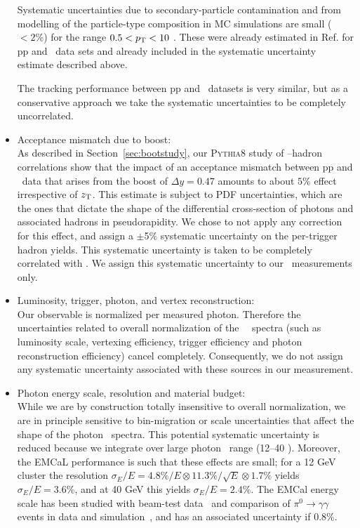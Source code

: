\begin{itemize}
Systematic uncertainties due to secondary-particle contamination and from modelling of the particle-type composition in MC simulations are small ($<2\%$) for the range $0.5<p_{\mathrm{T}}<10$ \GeVc. These were already estimated in Ref.\cite{Acharya:2018qsh} for pp and \pPb~data sets and already included in the systematic uncertainty estimate described above. 

The tracking performance between pp and \pPb~datasets is very similar, but as a conservative approach we take the systematic uncertainties to be completely uncorrelated.



\item Acceptance mismatch due to boost:\\
As described in Section~\ref{sec:bootstudy}, our \textsc{Pythia8} study of \gammaiso--hadron correlations show that the impact of an acceptance mismatch between pp and \pPb~data that arises from the boost of $\Delta y = 0.47$ amounts to about $5\%$ effect irrespective of $z_{\mathrm{T}}$. This estimate is subject to PDF uncertainties, which are the ones that dictate the shape of the differential cross-section of photons and associated hadrons in pseudorapidity. We chose to not apply any correction for this effect, and assign a $\pm$5$\%$ systematic uncertainty on the per-trigger hadron yields. This systematic uncertainty is taken to be completely correlated with \zt. We assign this systematic uncertainty to our \pPb~measurements only. 


\item Luminosity, trigger, photon, and vertex reconstruction:\\
Our observable is normalized per measured photon. Therefore the uncertainties related to overall normalization of the \gammaiso~\pt~spectra (such as luminosity scale, vertexing efficiency, trigger efficiency and photon reconstruction efficiency) cancel completely. Consequently, we do not assign any systematic uncertainty associated with these sources in our measurement. 
\item Photon energy scale, resolution and material budget:\\
While we are by construction totally insensitive to overall normalization, we are in principle sensitive to bin-migration or scale uncertainties that affect the shape of the photon \pt~spectra. This potential systematic uncertainty is reduced because we integrate over large photon \pt~range (12--40 \GeVc). Moreover, the EMCaL performance is such that these effects are small; for a 12 GeV cluster the resolution  $\sigma_{E}/E = 4.8\%/E\otimes 11.3\%/\sqrt{E}\otimes 1.7\%$ yields $\sigma_{E}/E =3.6\%$, and at 40 GeV this yields $\sigma_{E}/E =2.4\%$. The EMCal energy scale has been studied with beam-test data~\cite{Allen:2009aa} and comparison of $\pi^{0}\to\gamma\gamma$ events in data and simulation~\cite{Adam:2016khe}, and has an associated uncertainty if 0.8$\%$. 


\end{itemize}
